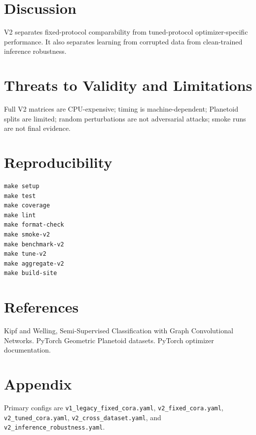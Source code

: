 \documentclass[11pt]{article}
\begin{document}
\section{Discussion}
V2 separates fixed-protocol comparability from tuned-protocol optimizer-specific performance. It also separates learning from corrupted data from clean-trained inference robustness.
\section{Threats to Validity and Limitations}
Full V2 matrices are CPU-expensive; timing is machine-dependent; Planetoid splits are limited; random perturbations are not adversarial attacks; smoke runs are not final evidence.
\section{Reproducibility}
\begin{verbatim}
make setup
make test
make coverage
make lint
make format-check
make smoke-v2
make benchmark-v2
make tune-v2
make aggregate-v2
make build-site
\end{verbatim}
\section{References}
Kipf and Welling, Semi-Supervised Classification with Graph Convolutional Networks. PyTorch Geometric Planetoid datasets. PyTorch optimizer documentation.
\section{Appendix}
Primary configs are \texttt{v1\_legacy\_fixed\_cora.yaml}, \texttt{v2\_fixed\_cora.yaml}, \texttt{v2\_tuned\_cora.yaml}, \texttt{v2\_cross\_dataset.yaml}, and \texttt{v2\_inference\_robustness.yaml}.
\end{document}
